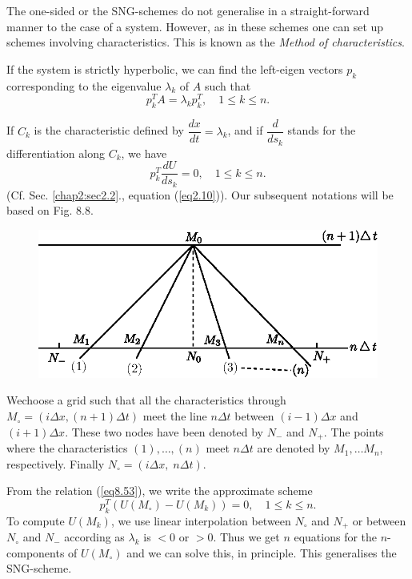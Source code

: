 The one-sided or the SNG-schemes do not generalise in a straight-forward manner to the case of a system. However, as in these schemes one can set up schemes involving characteristics. This is known as the {\em Method of characteristics}.

If the system is strictly hyperbolic, we can find the left-eigen vectors $p_k$ corresponding to the eigenvalue $\lambda_k$ of $A$ such that
\begin{equation*}
p^T_k A = \lambda_k p^T_k, \quad 1 \leq k \leq n. \tag{8.52}\label{eq8.52}
\end{equation*}

If $C_k$ is the characteristic defined by $\dfrac{dx}{dt} = \lambda_k$, and if $\dfrac{d}{ds_k}$ stands for the differentiation along $C_k$, we have
\begin{equation*}
p^T_k \frac{dU}{ds_k} = 0, \quad 1 \leq k \leq n. \tag{8.53}\label{eq8.53}
\end{equation*}
(Cf. Sec. \ref{chap2:sec2.2}., equation (\ref{eq2.10})). Our subsequent notations will be based on Fig. 8.8. 

\begin{figure}[H]
\centering
\includegraphics{figures/fig52-8.8.eps}
\caption{}\label{c8:fig8.8}
\end{figure}

We\pageoriginale choose a grid such that all the characteristics
through $M_\circ = (i\Delta x, (n+1)\Delta t)$ meet the line $n\Delta
t$ between $(i-1)\Delta x$ and $(i+1) \Delta x$. These two nodes have
been denoted by $N_-$ and $N_+$. The points where the characteristics
$(1), \ldots, (n)$ meet $n\Delta t$ are denoted by $M_1, \ldots M_n$,
respectively. Finally $N_\circ = (i\Delta x, \; n\Delta t)$.  

From the relation (\ref{eq8.53}), we write the approximate scheme
\begin{equation*}
p^T_k (U(M_\circ) - U(M_k)) = 0, \quad 1 \leq k \leq n . \tag{8.54}\label{eq8.54}
\end{equation*}
To compute $U(M_k)$, we use linear interpolation between $N_\circ$ and $N_+$ or between $N_\circ$ and $N_-$ according as $\lambda_k$ is $< 0$ or $> 0$. Thus we get $n$ equations for the $n$-components of $U(M_\circ)$ and we can solve this, in principle. This generalises the SNG-scheme.

